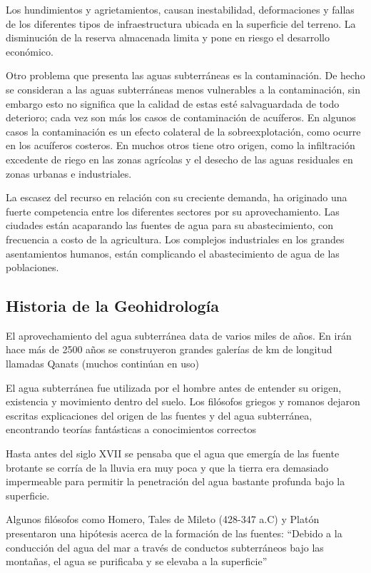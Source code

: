 Los hundimientos y agrietamientos, causan inestabilidad, deformaciones y fallas de los diferentes tipos de infraestructura ubicada en la superficie del terreno. La disminución de la reserva almacenada limita y pone en riesgo el desarrollo económico.

Otro problema que presenta las aguas subterráneas es la contaminación. De hecho se consideran a las aguas subterráneas menos vulnerables a la contaminación, sin embargo esto no significa que la calidad de estas esté salvaguardada de todo deterioro; cada vez son más los casos de contaminación de acuíferos. En algunos casos la contaminación es un efecto colateral de la sobreexplotación, como ocurre en los acuíferos costeros. En muchos otros tiene otro origen, como la infiltración excedente de riego en las zonas agrícolas y el desecho de las aguas residuales en zonas urbanas e industriales.

La escasez del recurso en relación con su creciente demanda, ha originado una fuerte competencia entre los diferentes sectores por su aprovechamiento. Las ciudades están acaparando las fuentes de agua para su abastecimiento, con frecuencia a costo de la agricultura. Los complejos industriales en los grandes asentamientos humanos, están complicando el abastecimiento de agua de las poblaciones.
\subsection{Historia de la Geohidrología}
El aprovechamiento del agua subterránea data de varios miles de años. En irán hace más de 2500 años se construyeron grandes galerías de km de longitud llamadas Qanats (muchos continúan en uso)

El agua subterránea fue utilizada por el hombre antes de entender su origen, existencia y movimiento dentro del suelo. Los filósofos griegos y romanos dejaron escritas explicaciones del origen de las fuentes y del agua subterránea, encontrando teorías fantásticas a conocimientos correctos

Hasta antes del siglo XVII se pensaba que el agua que emergía de las fuente brotante se corría de la lluvia era muy poca y que la tierra era demasiado impermeable para permitir la penetración del agua bastante profunda bajo la superficie.

Algunos filósofos como Homero, Tales de Mileto (428-347 a.C) y Platón presentaron una hipótesis acerca de la formación de las fuentes: ``Debido a la conducción del agua del mar a través de conductos subterráneos bajo las montañas, el agua se purificaba y se elevaba a la superficie''

